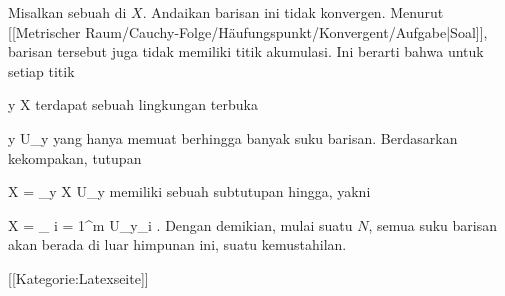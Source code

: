 Misalkan
 sebuah
di $X$. Andaikan barisan ini tidak konvergen. Menurut
[[Metrischer Raum/Cauchy-Folge/Häufungspunkt/Konvergent/Aufgabe|Soal]],
barisan tersebut juga tidak memiliki titik akumulasi. Ini berarti bahwa untuk setiap titik

\mavergleichskette
{\vergleichskette
{ y
}
{ \in }{ X
}
{  }{
}
{    }{
}
{   }{
}
}
{}{}{}
terdapat sebuah lingkungan terbuka

\mavergleichskette
{\vergleichskette
{ y
}
{ \in }{ U_y
}
{  }{
}
{    }{
}
{   }{
}
}
{}{}{}
yang hanya memuat berhingga banyak suku barisan. Berdasarkan kekompakan, tutupan

\mavergleichskettedisp
{\vergleichskette
{ X
}
{ =} { \bigcup_{y \in X} U_y
}
{ } {
}
{ } {
}
{ } {
}
}
{}{}{}
memiliki sebuah subtutupan hingga, yakni

\mavergleichskettedisp
{\vergleichskette
{ X
}
{ =} { \bigcup_{ i = 1}^m  U_{y_i }
}
{ } {
}
{ } {
}
{ } {
}
}
{}{}{.}
Dengan demikian, mulai suatu $N$, semua suku barisan akan berada di luar himpunan ini, suatu kemustahilan.

 [[Kategorie:Latexseite]]
